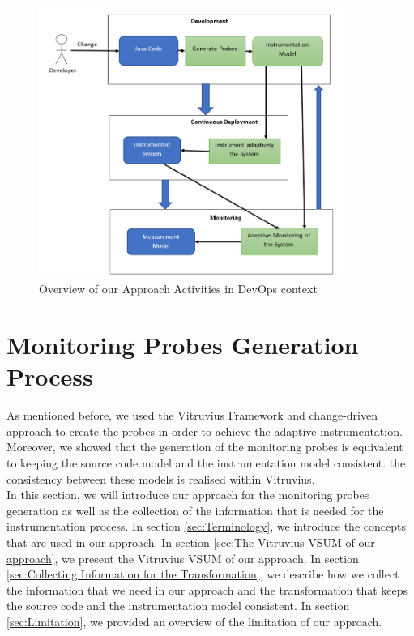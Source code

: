 \begin{figure}[h]
\centering
\includegraphics[width=0.9\textwidth]{figures/devops_approach}
\caption{Overview of our Approach Activities in DevOps context}
\label{fig:devops_approach}
\end{figure}

\section{Monitoring Probes Generation Process}
\label{sec:Monitoring Probes Generation Process}
As mentioned before, we used the Vitruvius Framework and change-driven approach to create the probes in order to achieve the adaptive instrumentation. Moreover, we showed that the generation of the monitoring probes is equivalent to keeping the source code model and the instrumentation model consistent. the consistency between these models is realised within Vitruvius.\\

In this section, we will introduce our approach for the monitoring probes generation as well as the collection of the information that is needed for the instrumentation process. In section \ref{sec:Terminology}, we introduce the concepts that are used in our approach. In section \ref{sec:The Vitruvius VSUM of our approach}, we present the Vitruvius VSUM of our approach. In section \ref{sec:Collecting Information for the Transformation}, we describe how we collect the information that we need in our approach and the transformation that keeps the source code and the instrumentation model consistent. In section \ref{sec:Limitation}, we provided an overview of the limitation of our approach.\\

